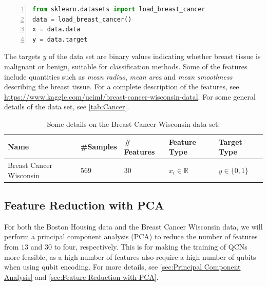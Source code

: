 \begin{lstlisting}[language=python, numbers=left]
from sklearn.datasets import load_breast_cancer
data = load_breast_cancer()
x = data.data
y = data.target
\end{lstlisting}

The targets $y$ of the data set are binary values indicating whether breast tissue is malignant or benign, suitable for classification methods. Some of the features include quantities such as \emph{mean radius}, \emph{mean area} and \emph{mean smoothness} describing the breast tissue. For a complete description of the features, see \url{https://www.kaggle.com/uciml/breast-cancer-wisconsin-datal}. For some general details of the data set, see \autoref{tab:Cancer}.

\begin{table}[H]
\begin{tabular}{|l|l|l|l|l|}
\hline
 Name& \#Samples&  \# Features& Feature Type& Target Type \\ \hline
 Breast Cancer Wisconsin&  569&  30& $x_i \in \mathbb{R}$ & $y \in \{0,1\}$  \\ 
 \hline
 
\end{tabular}
\caption{Some details on the Breast Cancer Wisconsin data set.}
\label{tab:Cancer}
\end{table}


\subsection{Feature Reduction with PCA}\label{sec:Feature Reduction with PCA}
For both the Boston Housing data and the Breast Cancer Wisconsin data, we will perform a principal component analysis (PCA) to reduce the number of features from $13$ and $30$ to four, respectively. This is for making the training of QCNs more feasible, as a high number of features also require a high number of qubits when using qubit encoding. For more details, see \autoref{sec:Principal Component Analysis} and \autoref{sec:Feature Reduction with PCA}.






